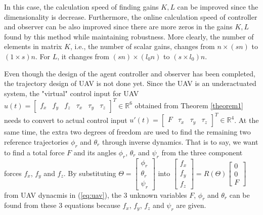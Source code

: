 \documentclass{ieeeaccess}
\newtheorem{remark}{Remark}
\begin{document}
In this case, the calculation speed of finding gains $K,L$ can be improved since the dimensionality is decrease. Furthermore, the online calculation speed of controller and observer can be also improved since there are more zeros in the gains $K,L$ found by this method while maintaining robustness. More clearly, the number of elements in matrix $K$, i.e., the number of scalar gains, changes from $n\times(sn)$ to $(1\times s)n$. For $L$, it changes from $(sn)\times(l_0n)$ to $(s\times l_0)n$.

Even though the design of the agent controller and observer has been completed, the trajectory design of UAV is not done yet. Since the UAV is an underactuated system, the "virtual" control input for UAV $u(t)=\begin{bmatrix}
    f_x & f_y & f_z & \tau_x & \tau_y & \tau_z 
\end{bmatrix}^T\in\mathbb{R}^6$ obtained from Theorem \ref{theorem1} needs to convert to actual control input $u'(t)=\begin{bmatrix}
    F & \tau_x & \tau_y & \tau_z 
\end{bmatrix}^T\in\mathbb{R}^4$. At the same time, the extra two degrees of freedom are used to find the remaining two reference trajectories $\phi_r$ and $\theta_r$ through inverse dynamics. That is to say, we want to find a total force $F$ and its angles $\phi_r$, $\theta_r$ and $\psi_r$ from the three component forces $f_x$, $f_y$ and $f_z$. By substituting $\Theta=\begin{bmatrix}
    \phi_r \\ \theta_r \\ \psi_r
\end{bmatrix}$ into $\begin{bmatrix}
        f_x \\ f_y \\ f_z
    \end{bmatrix} = R(\Theta)\begin{bmatrix}
        0 \\ 0 \\ F
\end{bmatrix} $ from UAV dynacmis in (\ref{eq:uav}), the 3 unknown variables $F$, $\phi_r$ and $\theta_r$ can be found from these 3 equations because $f_x$, $f_y$, $f_z$ and $\psi_r$ are given.
\end{document}
